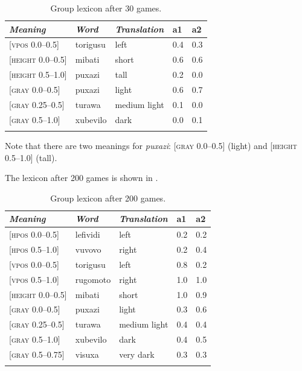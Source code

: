 \begin{table}[b]
\begin{center}
\begin{tabular}{ l  l  l  l  l }
\lsptoprule
{\itshape Meaning}&{\itshape Word}&{\itshape Translation} & {\bfshape  a1}&{\bfshape  a2} \\ \midrule
{}[\textsc{vpos} 0.0–0.5] &torigusu&left&0.4&0.3\\ 
{}[\textsc{height} 0.0–0.5]&mibati&short &0.6&0.6\\ 
{}[\textsc{height} 0.5–1.0]&puxazi&tall &0.2&0.0\\ 
{}[\textsc{gray} 0.0–0.5]& puxazi&light &0.6&0.7\\ 
{}[\textsc{gray} 0.25–0.5]&turawa&medium light&0.1&0.0\\ 
{}[\textsc{gray} 0.5–1.0]& xubevilo&dark &0.0&0.1\\ 
\lspbottomrule
\end{tabular}
\caption{\label{tab:after30}Group lexicon after 30 games.}
\end{center}
\end{table}

Note that there are two meanings for \textit{puxazi}: \enlargethispage{1\baselineskip}
{}[\textsc{gray} 0.0–0.5] (light) and [\textsc{height} 0.5–1.0] (tall). 

The lexicon after 200 games is shown in . 


\begin{table} 
\begin{center}
\begin{tabular}{ l  l  l  l  l }
\lsptoprule
{\itshape Meaning}&{\itshape Word}&{\itshape Translation} & {\bfshape  a1}&{\bfshape  a2} \\ \midrule
{}[\textsc{hpos} 0.0–0.5] &lefividi&left&0.2&0.2\\ 
{}[\textsc{hpos} 0.5–1.0] &vuvovo&right&0.2&0.4\\ 
{}[\textsc{vpos} 0.0–0.5] &torigusu&left&0.8&0.2\\ 
{}[\textsc{vpos} 0.5–1.0] &rugomoto&right&1.0&1.0\\ 
{}[\textsc{height} 0.0–0.5]&mibati&short &1.0&0.9\\ 
{}[\textsc{gray} 0.0–0.5]& puxazi&light &0.3&0.6\\ 
{}[\textsc{gray} 0.25–0.5]&turawa&medium light&0.4&0.4\\ 
{}[\textsc{gray} 0.5–1.0]& xubevilo&dark &0.4&0.5\\ 
{}[\textsc{gray} 0.5–0.75]& visuxa&very dark &0.3&0.3\\ 
\lspbottomrule
\end{tabular}
\caption{\label{tab:after200}Group lexicon after 200 games.}
\end{center}
\end{table}

